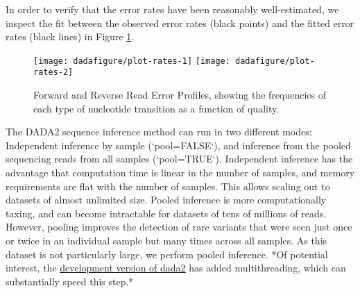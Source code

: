 In order to verify that the error rates have been reasonably
well-estimated, we inspect the fit between the observed error rates (black
points) and the fitted error rates (black lines) in Figure \ref{fig:errorprofile1}.


\begin{knitrout}
\color{fgcolor}\begin{kframe}
\begin{alltt}
\end{alltt}
\end{kframe}
\begin{kframe}\begin{alltt}
\end{alltt}
\end{kframe}
\end{knitrout}
\begin{figure}
\texttt{[image: dadafigure/plot-rates-1]} 
\texttt{[image: dadafigure/plot-rates-2]} 
\caption{Forward and Reverse Read Error Profiles, showing the
  frequencies of each type of nucleotide transition as a function of quality.}
  \label{fig:errorprofile1}
\end{figure}

The DADA2 sequence inference method can run in two different modes:
Independent inference by sample (`pool=FALSE`), and inference from the
pooled sequencing reads from all samples (`pool=TRUE`). Independent
inference has the advantage that computation time is linear
in the number of samples, and memory requirements are flat with the
number of samples. This allows scaling out to datasets of almost unlimited
size. Pooled inference is more computationally taxing, and can become
intractable for datasets of tens of millions of reads.
However, pooling improves the detection of rare variants that
were seen just once or twice in an individual sample but many times across
all samples. As this dataset is not particularly large, we perform pooled 
inference. *Of potential interest, the 
\href{https://github.com/benjjneb/dada2}{development version of dada2}
has added multithreading, which can substantially speed this step.*

